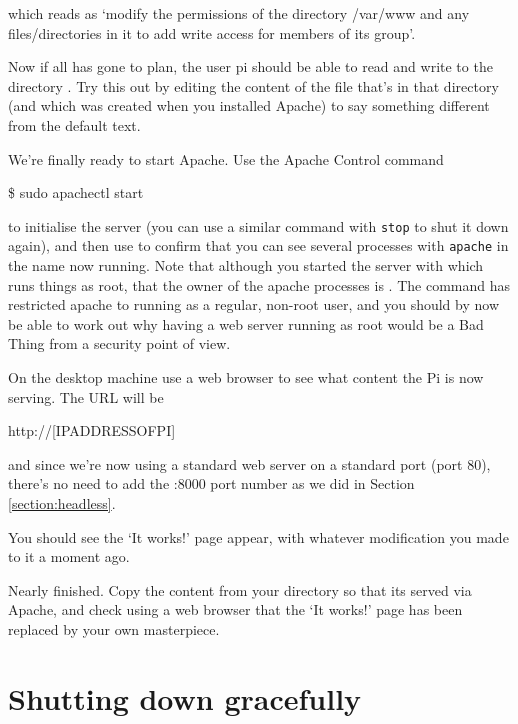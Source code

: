 which reads as `modify the permissions of the directory /var/www and any files/directories in it to add write access for members of its group'.

Now if all has gone to plan, the user pi should be able to read and write to the directory . Try this out by editing the content of the  file that's in that directory (and which was created when you installed Apache) to say something different from the default text.

We're finally ready to start Apache. Use the Apache Control command

\begin{ttoutenv}
\$ sudo apachectl start
\end{ttoutenv}

to initialise the server (you can use a similar command with \texttt{stop} to shut it down again), and then use  to confirm that you can see several processes with \texttt{apache} in the name now running. Note that although you started the server with  which runs things as root, that the owner of the apache processes is . The  command has restricted apache to running as a regular, non-root user, and you should by now be able to work out why having a web server running as root would be a Bad Thing from a security point of view.

On the desktop machine use a web browser to see what content the Pi is now serving. The URL will be

\begin{ttoutenv}
http://[IPADDRESSOFPI]
\end{ttoutenv}

and since we're now using a standard web server on a standard port (port 80), there's no need to add the :8000 port number as we did in Section \ref{section:headless}.

You should see the `It works!' page appear, with whatever modification you made to it a moment ago.

Nearly finished. Copy the content from your  directory so that its served via Apache, and check using a web browser that the `It works!' page has been replaced by your own masterpiece.

\section{Shutting down gracefully}

